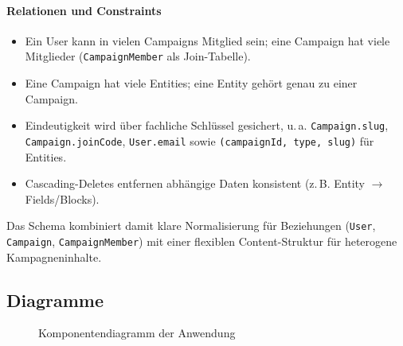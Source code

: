 \paragraph{Relationen und Constraints}
\begin{itemize}
  \item Ein User kann in vielen Campaigns Mitglied sein; eine Campaign hat viele
  Mitglieder (\texttt{CampaignMember} als Join-Tabelle).
  \item Eine Campaign hat viele Entities; eine Entity gehört genau zu einer Campaign.
  \item Eindeutigkeit wird über fachliche Schlüssel gesichert, u.\,a.
  \texttt{Campaign.slug}, \texttt{Campaign.joinCode},
  \texttt{User.email} sowie \texttt{(campaignId, type, slug)} für Entities.
  \item Cascading-Deletes entfernen abhängige Daten konsistent
  (z.\,B. Entity $\rightarrow$ Fields/Blocks).
\end{itemize}

Das Schema kombiniert damit klare Normalisierung für Beziehungen
(\texttt{User}, \texttt{Campaign}, \texttt{CampaignMember}) mit einer flexiblen
Content-Struktur für heterogene Kampagneninhalte.

\FloatBarrier
\subsection{Diagramme}

\begin{figure}[H]
\centering
{}
\caption{Komponentendiagramm der Anwendung}
\label{fig:komponenten}
\end{figure}

